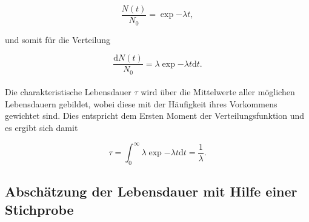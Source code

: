 \begin{equation}
	\frac{N(t)}{N_\text{0}} = \exp{-\lambda t},
\end{equation}

und somit für die Verteilung
 
\begin{equation}
	\frac{\text{d}N(t)}{N_\text{0}} = \lambda \exp{-\lambda t} \text{d}t .
\end{equation}
\\
Die charakteristische Lebensdauer $\tau$ wird über die Mittelwerte aller möglichen Lebensdauern gebildet, wobei diese mit der Häufigkeit ihres Vorkommens gewichtet sind.
Dies entspricht dem Ersten Moment der Verteilungsfunktion und es ergibt sich damit

\begin{equation}
	\tau = \int_\text{0}^\infty \lambda \exp{-\lambda t} \text{d}t = \frac{1}{\lambda} .
\end{equation}

\subsection{Abschätzung der Lebensdauer mit Hilfe einer Stichprobe} %
\label{sub:abschaetzung_der_lebensdauer_mit_hilfe_einer_stichprobe}

